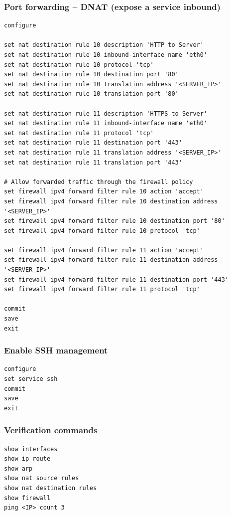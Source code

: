 \subsubsection{Port forwarding -- DNAT (expose a service inbound)}

\begin{lstlisting}
configure

set nat destination rule 10 description 'HTTP to Server'
set nat destination rule 10 inbound-interface name 'eth0'
set nat destination rule 10 protocol 'tcp'
set nat destination rule 10 destination port '80'
set nat destination rule 10 translation address '<SERVER_IP>'
set nat destination rule 10 translation port '80'

set nat destination rule 11 description 'HTTPS to Server'
set nat destination rule 11 inbound-interface name 'eth0'
set nat destination rule 11 protocol 'tcp'
set nat destination rule 11 destination port '443'
set nat destination rule 11 translation address '<SERVER_IP>'
set nat destination rule 11 translation port '443'

# Allow forwarded traffic through the firewall policy
set firewall ipv4 forward filter rule 10 action 'accept'
set firewall ipv4 forward filter rule 10 destination address '<SERVER_IP>'
set firewall ipv4 forward filter rule 10 destination port '80'
set firewall ipv4 forward filter rule 10 protocol 'tcp'

set firewall ipv4 forward filter rule 11 action 'accept'
set firewall ipv4 forward filter rule 11 destination address '<SERVER_IP>'
set firewall ipv4 forward filter rule 11 destination port '443'
set firewall ipv4 forward filter rule 11 protocol 'tcp'

commit
save
exit
\end{lstlisting}

\subsubsection{Enable SSH management}

\begin{lstlisting}
configure
set service ssh
commit
save
exit
\end{lstlisting}

\subsubsection{Verification commands}

\begin{lstlisting}
show interfaces
show ip route
show arp
show nat source rules
show nat destination rules
show firewall
ping <IP> count 3
\end{lstlisting}

